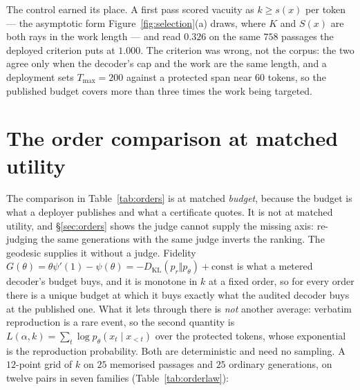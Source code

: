 The control earned its place. A first pass scored vacuity as $k \ge s(x)$ per token --- the
asymptotic form Figure~\ref{fig:selection}(a) draws, where $K$ and $S(x)$ are both rays in the work
length --- and read $0.326$ on the same $758$ passages the deployed criterion puts at $1.000$. The
criterion was wrong, not the corpus: the two agree only when the decoder's cap and the work are the
same length, and a deployment sets $T_{\max} = 200$ against a protected span near $60$ tokens, so the
published budget covers more than three times the work being targeted.

\section{The order comparison at matched utility}\label{app:matched}
The comparison in Table~\ref{tab:orders} is at matched \emph{budget}, because the budget is what a
deployer publishes and what a certificate quotes. It is not at matched utility, and
\S\ref{sec:orders} shows the judge cannot supply the missing axis: re-judging the same generations
with the same judge inverts the ranking. The geodesic supplies it without a judge. Fidelity
$G(\theta) = \theta\psi'(1) - \psi(\theta) = -D_{\mathrm{KL}}(p_r \Vert p_\theta) + \mathrm{const}$
is what a metered decoder's budget buys, and it is monotone in $k$ at a fixed order, so for every
order there is a unique budget at which it buys exactly what the audited decoder buys at the
published one. What it lets through there is \emph{not} another average: verbatim reproduction is a
rare event, so the second quantity is
$L(\alpha,k) = \sum_t \log p_\theta(x_t \mid x_{<t})$ over the protected tokens, whose exponential
is the reproduction probability. Both are deterministic and need no sampling. A $12$-point grid of
$k$ on $25$ memorised passages and $25$ ordinary generations, on twelve pairs in seven families (Table~\ref{tab:orderlaw}):

